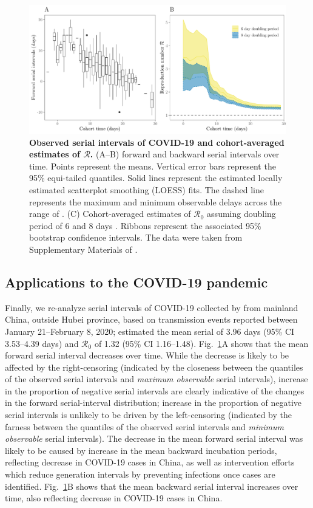\documentclass[12pt]{article}
\newcommand{\fref}[1]{Fig.~\ref{fig:#1}}
\newcommand{\Rx}[1]{\ensuremath{{\mathcal R}_{#1}}\xspace}
\newcommand{\Ro}{\Rx{0}}
\newcommand{\RR}{\ensuremath{{\mathcal R}}\xspace}
\begin{document}
\begin{figure}[!th]
\includegraphics[width=\textwidth]{serial_analysis.pdf}
\caption{
\textbf{Observed serial intervals of COVID-19 and cohort-averaged estimates of \RR.}
(A--B) forward and backward serial intervals over time.
Points represent the means. 
Vertical error bars represent the 95\% equi-tailed quantiles.
Solid lines represent the estimated locally estimated scatterplot smoothing (LOESS) fits.
The dashed line represents the maximum and minimum observable delays across the range of .
(C) Cohort-averaged estimates of \Ro assuming doubling period of 6 and 8 days \citep{li2020early, wu2020nowcasting}.
Ribbons represent the associated 95\% bootstrap confidence intervals.
The data were taken from Supplementary Materials of \cite{du2020serial}.
}
\label{fig:du}
\end{figure}

\subsection{Applications to the COVID-19 pandemic}

Finally, we re-analyze serial intervals of COVID-19 collected by \cite{du2020serial} from mainland China, outside Hubei province, based on transmission events reported between January 21--February 8, 2020;
\cite{du2020serial} estimated the mean serial of 3.96 days (95\% CI 3.53–4.39 days) and \Ro of 1.32 (95\% CI 1.16–1.48).
\fref{du}A shows that the mean forward serial interval decreases over time.
While the decrease is likely to be affected by the right-censoring (indicated by the closeness between the quantiles of the observed serial intervals and \emph{maximum observable} serial intervals), increase in the proportion of negative serial intervals are clearly indicative of the changes in the forward serial-interval distribution;
increase in the proportion of negative serial intervals is unlikely to be driven by the left-censoring (indicated by the farness between the quantiles of the observed serial intervals and \emph{minimum observable} serial intervals).
The decrease in the mean forward serial interval was likely to be caused by increase in the mean backward incubation periods, reflecting decrease in COVID-19 cases in China, as well as intervention efforts which reduce generation intervals by preventing infections once cases are identified.
\fref{du}B shows that the mean backward serial interval increases over time, also reflecting decrease in COVID-19 cases in China.
\end{document}
